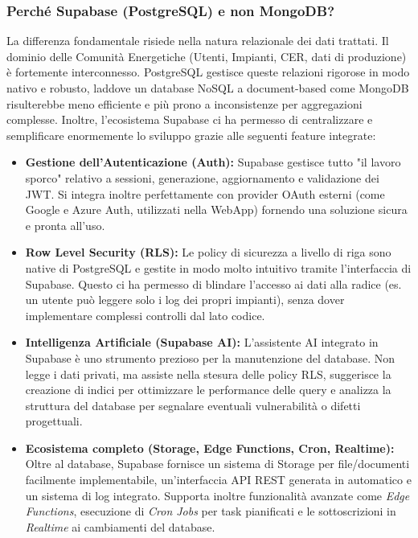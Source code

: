 \subsubsection*{Perché Supabase (PostgreSQL) e non MongoDB?}
La differenza fondamentale risiede nella natura relazionale dei dati trattati. Il dominio delle Comunità Energetiche (Utenti, Impianti, CER, dati di produzione) è fortemente interconnesso. PostgreSQL gestisce queste relazioni rigorose in modo nativo e robusto, laddove un database NoSQL a document-based come MongoDB risulterebbe meno efficiente e più prono a inconsistenze per aggregazioni complesse. Inoltre, l'ecosistema Supabase ci ha permesso di centralizzare e semplificare enormemente lo sviluppo grazie alle seguenti feature integrate:
\begin{itemize}
    \item \textbf{Gestione dell'Autenticazione (Auth):} Supabase gestisce tutto "il lavoro sporco" relativo a sessioni, generazione, aggiornamento e validazione dei JWT. Si integra inoltre perfettamente con provider OAuth esterni (come Google e Azure Auth, utilizzati nella WebApp) fornendo una soluzione sicura e pronta all'uso.
    \item \textbf{Row Level Security (RLS):} Le policy di sicurezza a livello di riga sono native di PostgreSQL e gestite in modo molto intuitivo tramite l'interfaccia di Supabase. Questo ci ha permesso di blindare l'accesso ai dati alla radice (es. un utente può leggere solo i log dei propri impianti), senza dover implementare complessi controlli dal lato codice.
    \item \textbf{Intelligenza Artificiale (Supabase AI):} L'assistente AI integrato in Supabase è uno strumento prezioso per la manutenzione del database. Non legge i dati privati, ma assiste nella stesura delle policy RLS, suggerisce la creazione di indici per ottimizzare le performance delle query e analizza la struttura del database per segnalare eventuali vulnerabilità o difetti progettuali.
    \item \textbf{Ecosistema completo (Storage, Edge Functions, Cron, Realtime):} Oltre al database, Supabase fornisce un sistema di Storage per file/documenti facilmente implementabile, un'interfaccia API REST generata in automatico e un sistema di log integrato. Supporta inoltre funzionalità avanzate come \textit{Edge Functions}, esecuzione di \textit{Cron Jobs} per task pianificati e le sottoscrizioni in \textit{Realtime} ai cambiamenti del database.
\end{itemize}

